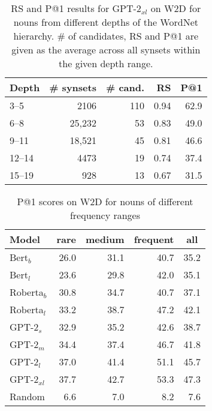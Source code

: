 \documentclass[11pt,a4paper]{article}
\begin{document}
\begin{table}
    \centering
    \begin{tabular}{l|rrrr}
        \hline
         \textbf{Depth} & \textbf{\# synsets} & \textbf{\# cand.} & \textbf{RS} & \textbf{P@1} \\ \hline
     3--5 & 2106 & 110 & 0.94 & 62.9 \\
     6--8 & 25,232 & 53 & 0.83 & 49.0 \\
     9--11 & 18,521 & 45 & 0.81 & 46.6 \\
     12--14 & 4473 & 19 & 0.74 & 37.4 \\ 
     15--19 & 928 & 13 & 0.67 & 31.5 \\ \hline
     
    \end{tabular}
    \caption{RS and P@1 results for GPT-2$_{xl}$  on W2D for
      nouns from different  depths of the WordNet hierarchy. \# of candidates, RS and P@1 are given as the average across all synsets within the given depth range. }
    \label{tab:WN_depth}
\end{table}



\begin{table}
    \centering
    \begin{tabular}{l|rrrr}
    \hline
         \textbf{Model} & \multicolumn{1}{c}{\textbf{rare}} & \multicolumn{1}{c}{\textbf{medium}} & \multicolumn{1}{c}{\textbf{frequent}} & \multicolumn{1}{c}{\textbf{all}} \\ \hline
     Bert$_{b}$ & 26.0 & 31.1 & 40.7 & 35.2 \\
     Bert$_{l}$ & 23.6 & 29.8 & 42.0 & 35.1 \\
     Roberta$_{b}$ & 30.8 & 34.7 & 40.7 & 37.1 \\
     Roberta$_{l}$ & 33.2 & 38.7 & 47.2 & 42.1 \\ \hline
     GPT-2$_{s}$ & 32.9 & 35.2 & 42.6 & 38.7 \\
     GPT-2$_{m}$ & 34.4 & 37.4 & 46.7 & 41.8 \\
     GPT-2$_{l}$ & 37.0 & 41.4 & 51.1 & 45.7 \\
     GPT-2$_{xl}$ & 37.7 & 42.7 & 53.3 & 47.3 \\ \hline
     Random & 6.6 & 7.0 & 8.2 & 7.6 \\ \hline 
     
    \end{tabular}
    \caption{P@1 scores on W2D for nouns of different
      frequency ranges}
    \label{tab:freq_results_W2D}
\end{table}
\end{document}
